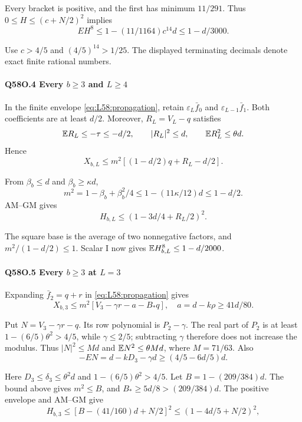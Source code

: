 Every bracket is positive, and the first has minimum \(11/291\).
Thus \(0\le\allowbreak  H\le\allowbreak (c+N/2)^2\) implies
\[
EH^8\le1-(11/1164)c^{14}d\le1-d/3000.
\tag{Q58O.3.7}\label{eq:Q58O:3.7}
\]

Use \(c>\allowbreak 4/5\) and \((4/5)^{14}>\allowbreak 1/25\).
The displayed terminating decimals denote exact finite rational numbers.

\paragraph{Q58O.4 Every $b\ge\allowbreak 3$ and $L\ge\allowbreak 4$}
In the finite envelope \eqref{eq:L58:propagation}, retain
\(\varepsilon_L\bar f_0\) and \(\varepsilon_{L-1}\bar f_1\).
Both coefficients are at least \(d/2\).
Moreover, \(R_L=\allowbreak V_L-q\) satisfies
\[
\mathbb E R_L\le-\tau\le-d/2,\qquad |R_L|^2\le d,\qquad
\mathbb E R_L^2\le\theta d.
\]
Hence
\[
X_{b,L}\le m^2[(1-d/2)q+R_L-d/2].
\]

From \(\beta_b\le\allowbreak  d\) and \(\beta_b\ge\allowbreak \kappa d\),
\[
m^2=1-\beta_b+\beta_b^2/4\le1-(11\kappa/12)d\le1-d/2.
\]
AM--GM gives
\[
H_{b,L}\le(1-3d/4+R_L/2)^2.
\tag{Q58O.4.1}\label{eq:Q58O:4.1}
\]

The square base is the average of two nonnegative factors, and
\(m^2/(1-d/2)\le\allowbreak 1\). Scalar I now gives
\(\mathbb E H_{b,\allowbreak L}^8\le\allowbreak 1-d/2000\).

\paragraph{Q58O.5 Every $b\ge\allowbreak 3$ at $L=\allowbreak 3$}
Expanding \(\bar f_2=\allowbreak q+r\) in \eqref{eq:L58:propagation} gives
\[
X_{b,3}\le m^2[V_3-\gamma r-a-B_*q],\quad a=d-k\rho\ge41d/80.
\]

Put \(N=\allowbreak V_3-\gamma r-q\). Its row polynomial is \(P_2-\gamma\).
The real part of \(P_2\) is at least \(1-(6/5)\theta^2>\allowbreak 4/5\), while
\(\gamma\le\allowbreak 2/5\); subtracting \(\gamma\) therefore does not increase the modulus.
Thus \(|N|^2\le\allowbreak  Md\) and \(\mathbb E N^2\le\allowbreak \theta Md\), where \(M=\allowbreak 71/63\).
Also
\[
-EN=d-kD_3-\gamma d
\ge(4/5-6d/5)d.
\tag{Q58O.5.1}\label{eq:Q58O:5.1}
\]

Here \(D_3\le\allowbreak \delta_3\le\allowbreak \theta^2d\) and
\(1-(6/5)\theta^2>\allowbreak 4/5\).
Let \(B=\allowbreak 1-(209/384)d\). The bound above gives \(m^2\le\allowbreak  B\), and
\(B_*\ge\allowbreak 5d/8>\allowbreak (209/384)d\).
The positive envelope and AM--GM give
\[
H_{b,3}\le[B-(41/160)d+N/2]^2
\le(1-4d/5+N/2)^2,
\tag{Q58O.5.2}\label{eq:Q58O:5.2}
\]

